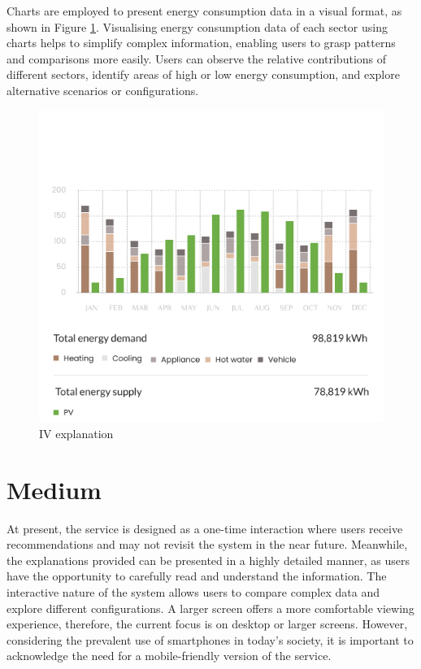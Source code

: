 Charts are employed to present energy consumption data in a visual format, as shown in Figure \ref{fig:iv}. 
Visualising energy consumption data of each sector using charts helps to simplify complex information, enabling users to grasp patterns and comparisons more easily. 
Users can observe the relative contributions of different sectors, identify areas of high or low energy consumption, and explore alternative scenarios or configurations. 
\begin{figure}[h!]
  \centering
  \includegraphics[width=\textwidth]{Images/iv.png}
  \caption{IV explanation}
  \label{fig:iv}
\end{figure}


\section{Medium}

At present, the service is designed as a one-time interaction where users receive recommendations and may not revisit the system in the near future. 
Meanwhile, the explanations provided can be presented in a highly detailed manner, as users have the opportunity to carefully read and understand the information. 
The interactive nature of the system allows users to compare complex data and explore different configurations. 
A larger screen offers a more comfortable viewing experience, therefore, the current focus is on desktop or larger screens.
However, considering the prevalent use of smartphones in today's society, it is important to acknowledge the need for a mobile-friendly version of the service. 


